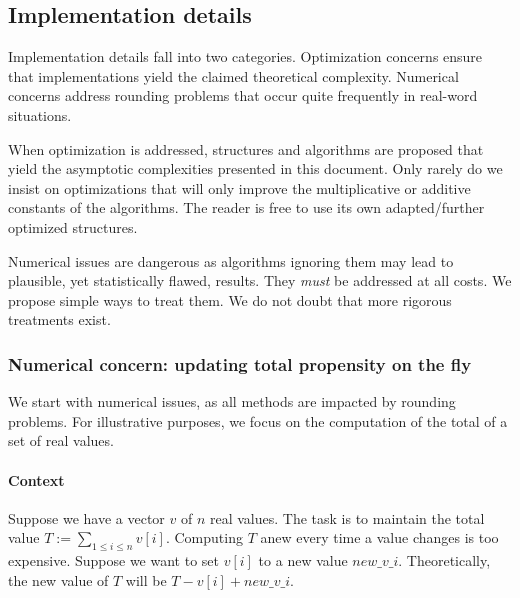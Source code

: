 
\subsection{Implementation details}
\label{sec:implementation_details}

Implementation details fall into two categories. Optimization concerns ensure that implementations yield the claimed theoretical complexity. Numerical concerns address rounding problems that occur quite frequently in real-word situations.

When optimization is addressed, structures and algorithms are proposed that yield the asymptotic complexities presented in this document. Only rarely do we insist on optimizations that will only improve the multiplicative or additive constants of the algorithms. The reader is free to use its own adapted/further optimized structures.

Numerical issues are dangerous as algorithms ignoring them may lead to plausible, yet statistically flawed, results. They \emph{must} be addressed at all costs. We propose simple ways to treat them. We do not doubt that more rigorous treatments exist.

\subsubsection{Numerical concern: updating total propensity on the fly}
\label{ssec:total_numerical}
We start with numerical issues, as all methods are impacted by rounding problems. For illustrative purposes, we focus on the computation of the total of a set of real values.

\paragraph{Context} Suppose we have a vector $v$ of $n$ real values. The task is to maintain the total value $T := \sum_{1\leq i\leq n}v[i]$. Computing $T$ anew every time a value changes is too expensive. Suppose we want to set $v[i]$ to a new value $new\_v\_i$. Theoretically, the new value of $T$ will be $T - v[i] + new\_v\_i$.

